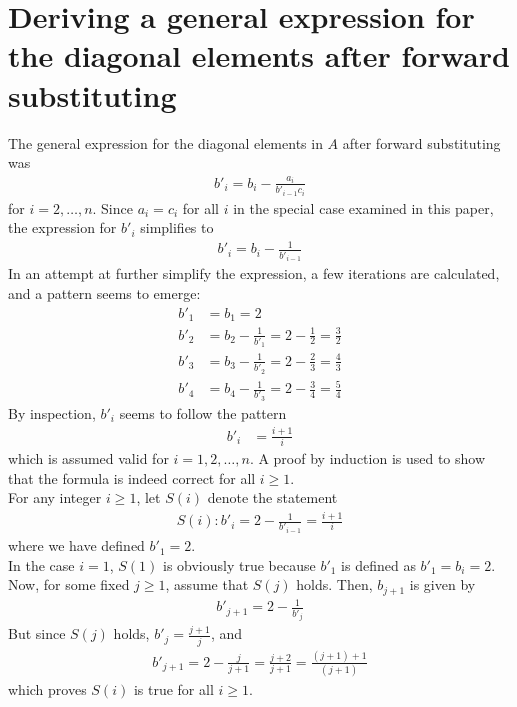 \documentclass[aps,reprint]{revtex4-1}
\begin{document}
\section{Deriving a general expression for the diagonal elements after forward substituting}
\label{app:dager}
The general expression for the diagonal elements in $A$ after forward substituting was
\begin{align*}
  b'_i = b_i - \frac{a_i}{b'_{i-1} c_i}
\end{align*}
for $i = 2, \hdots, n$. Since $a_i = c_i$ for all $i$ in the special case examined in this paper,
 the expression for $b'_i$ simplifies to
\begin{align*}
  b'_i = b_i - \frac{1}{b'_{i-1}}
\end{align*}
In an attempt at further simplify the expression, a few iterations are calculated, and
a pattern seems to emerge:
\begin{align*}
  b'_1 &= b_1 = 2\\
  b'_2 &= b_2 - \frac{1}{b'_1} = 2 - \frac{1}{2} = \frac{3}{2}\\
  b'_3 &= b_3 - \frac{1}{b'_2} = 2 - \frac{2}{3} = \frac{4}{3}\\
  b'_4 &= b_4 - \frac{1}{b'_3} = 2 - \frac{3}{4} = \frac{5}{4}
\end{align*}
By inspection, $b'_i$ seems to follow the pattern
\begin{align*}
  b'_i &= \frac{i+1}{i}
\end{align*}
which is assumed valid for $i = 1,2,\hdots,n$. A proof by induction is used to
show that the formula is indeed correct for all $i \geq 1$.
\\[12pt]
For any integer $i \geq 1$, let $S(i)$ denote the statement
\begin{align*}
  S(i): b'_i = 2 - \frac{1}{b'_{i-1}} = \frac{i+1}{i}
\end{align*}
where we have defined $b'_{1} = 2$.
\\[12pt]
In the case $i = 1$, $S(1)$ is obviously true because $b'_1$ is defined as $b'_1 = b_i = 2$.
Now, for some fixed $j \geq 1$, assume that $S(j)$ holds. Then, $b_{j+1}$ is given by
\begin{align*}
  b'_{j+1} = 2 - \frac{1}{b'_j}
\end{align*}
But since $S(j)$ holds, $b'_j = \frac{j+1}{j}$, and
\begin{align*}
  b'_{j+1} = 2 - \frac{j}{j+1} = \frac{j+2}{j+1} = \frac{(j+1) + 1}{(j+1)}
\end{align*}
which proves $S(i)$ is true for all $i \geq 1$.
\end{document}
